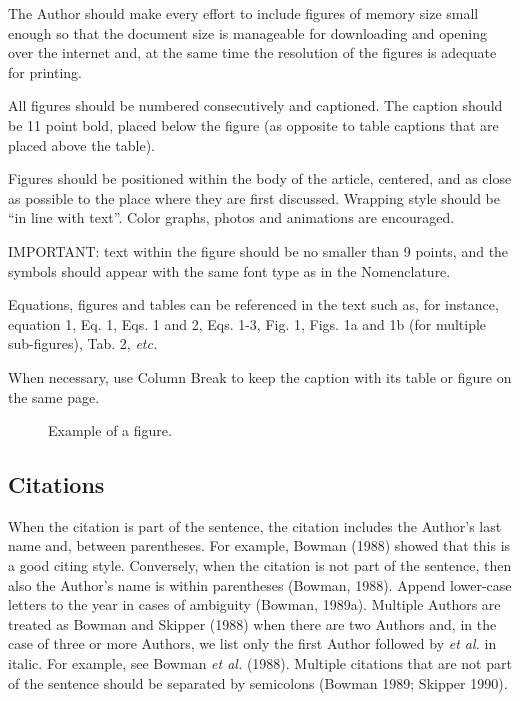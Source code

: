\documentclass[A4paper,11pt]{marine_2023_Paper}
\begin{document}
 The Author should make every effort to include figures of memory size small enough so that the document size is manageable for downloading and opening over the internet and, at the same time the resolution of the figures is adequate for printing.

 All figures should be numbered consecutively and captioned. The caption should be 11 point bold, placed below the figure (as opposite to table captions that are placed above the table).

 Figures should be positioned within the body of the article, centered, and as close as possible to the place where they are first discussed. Wrapping style should be ``in line with text''. Color graphs, photos and animations are encouraged.

 IMPORTANT: text within the figure should be no smaller than 9 points, and the symbols should appear with the same font type as in the Nomenclature.

 Equations, figures and tables can be referenced in the text such as, for instance, equation 1, Eq. 1, Eqs. 1 and 2, Eqs. 1-3, Fig. 1, Figs. 1a and 1b (for multiple sub-figures), Tab. 2, \textit{etc. }

 When necessary, use Column Break to keep the caption with its table or figure on the same page.

\begin{figure}[t]
\centering
\caption{Example of a figure.}
\label{fig1}
\end{figure}

\subsection{Citations}

 When the citation is part of the sentence, the citation includes the Author's last name and, between parentheses. For example, Bowman (1988) showed that this is a good citing style. Conversely, when the citation is not part of the sentence, then also the Author's name is within parentheses  (Bowman, 1988). Append lower-case letters to the year in cases of ambiguity (Bowman, 1989a). Multiple Authors are treated as Bowman and Skipper (1988) when there are two Authors and, in the case of three or more Authors, we list only the first Author followed by \textit{et al. }in italic. For example, see Bowman \textit{et al.} (1988). Multiple citations that are not part of the sentence should be separated by semicolons  (Bowman 1989; Skipper 1990).
\end{document}
